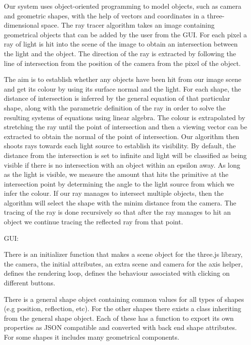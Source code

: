 \documentclass[11pt,a4paper]{article}
\begin{document}
Our system uses object-oriented programming to model objects, such as camera and geometric shapes, with the help of vectors and coordinates in a three-dimensional space. The ray tracer algorithm takes an image containing geometrical objects that can be added by the user from the GUI. For each pixel a ray of light is hit into the scene of the image to obtain an intersection between the light and the object. The direction of the ray is extracted by following the line of intersection from the position of the camera from the pixel of the object.

The aim is to establish whether any objects have been hit from our image scene and get its colour by using its surface normal and the light. For each shape, the distance of intersection is inferred by the general equation of that particular shape, along with the parametric definition of the ray in order to solve the resulting systems of equations using linear algebra. The colour is extrapolated by stretching the ray until the point of intersection and then a viewing vector can be extracted to obtain the normal of the point of intersection. Our algorithm then shoots rays towards each light source to establish its visibility. By default, the distance from the intersection is set to infinite and light will be classified as being visible if there is no intersection with an object within an epsilon away. As long as the light is visible, we measure the amount that hits the primitive at the intersection point by determining the angle to the light source from which we infer the colour. If our ray manages to intersect multiple objects, then the algorithm will select the shape with the minim distance from the camera. The tracing of the ray is done recursively so that after the ray manages to hit an object we continue tracing the reflected ray from that point.

GUI:

There is an initializer function that makes a scene object for the three.js library, the camera, the initial attributes, an extra scene and camera for the axis helper, defines the rendering loop, defines the behaviour associated with clicking on different buttons. 

There is a general shape object containing common values for all types of shapes (e.g position, reflection, etc). For the other shapes there exists a class inheriting from the general shape object. Each of these has a function to export its own properties as JSON compatible and converted with back end shape attributes. For some shapes it includes many geometrical components.
\end{document}
